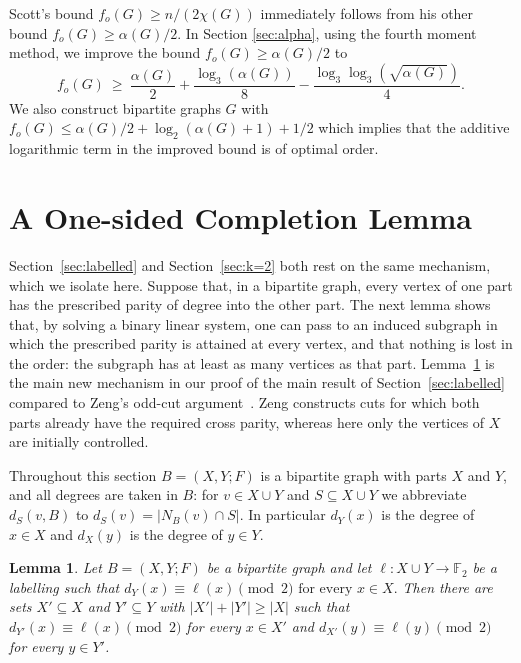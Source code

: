 \documentclass[11pt]{article}
\newcommand{\GG}[1]{{#1}}
\newtheorem{lemma}[theorem]{Lemma}
\theoremstyle{definition}
\theoremstyle{remark}
\newcommand{\fo}{f_o}
\newcommand{\F}{\mathbb{F}}
\newcommand{\1}{\mathbf{1}}
\begin{document}
	Scott's bound $\fo(G) \geq n/(2\chi(G))$ immediately follows from his other bound $\fo(G)\ge \alpha(G)/2$. In Section \ref{sec:alpha}, using the fourth moment method, 
	we improve the bound $\fo(G)\ge \alpha(G)/2$ to  
	\GG{$$
		f_o(G)\ \ge\ \frac{\alpha(G)}{2}+\frac{\log_3(\alpha(G))}{8}
		-\frac{\log_3\log_3(\sqrt{\alpha(G)})}{4}.
		$$
 We also construct bipartite graphs $G$ with
		$f_o(G)\le \alpha(G)/2+\log_2(\alpha(G)+1)+1/2$ which implies that the additive
		logarithmic term in the improved bound is of optimal order.
		}
	
	

	
	\section{A One-sided Completion Lemma}\label{sec:completion}
	
	Section~\ref{sec:labelled} and Section~\ref{sec:k=2} both rest on the same mechanism, which we isolate here.  Suppose that, in a bipartite graph, every vertex of one part has the prescribed
	parity of degree into the other part.  The next lemma shows that, by solving a binary linear system, one can pass to an induced subgraph in which the prescribed parity is attained at
	every vertex, and that nothing is lost in the order: the subgraph has at least as many vertices as that part. Lemma~\ref{lem:completion} is the main new mechanism in our
	proof of the main result of Section~\ref{sec:labelled} compared to Zeng's odd-cut argument~\cite{Zeng}. Zeng constructs cuts for which both parts already have the required cross
	parity, whereas here only the vertices of $X$ are initially controlled. 
	
	Throughout this section $B=(X,Y;F)$ is a bipartite graph with parts $X$ and $Y$, and all degrees
	are taken in $B$: for $v\in X\cup Y$ and $S\subseteq X\cup Y$ we abbreviate $d_S(v,B)$ to
	$d_S(v)=|N_B(v)\cap S|$.  In particular $d_Y(x)$ is the degree of $x\in X$ and $d_X(y)$ is the
	degree of $y\in Y$.
	
	\begin{lemma}\label{lem:completion}
		Let $B=(X,Y;F)$ be a bipartite graph and let $\ell:X\cup Y\to\F_2$ be a labelling such that
		$
		d_Y(x)\equiv \ell(x)\pmod 2
		\text{  for every }x\in X.
		$
		Then there are sets $X'\subseteq X$ and $Y'\subseteq Y$ with $|X'|+|Y'|\ge |X|$ such that
		$
		d_{Y'}(x)\equiv \ell(x)\pmod 2
		$
		for every $x\in X'$ and
		$
		d_{X'}(y)\equiv \ell(y)\pmod 2
		$
		for every $y\in Y'$.
	\end{lemma}
	
\end{document}
